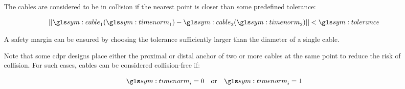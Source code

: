	The cables are considered to be in collision if the nearest point is closer
	than some predefined tolerance:

	\begin{equation}
		\norm{\cable_1(\timenorm_1) - \cable_2(\timenorm_2)} < \tol
	\end{equation}

	A safety margin can be ensured by choosing the tolerance sufficiently larger
	than the diameter of a single cable.

	Note that some \gls{cdpr} designs place either the proximal or distal anchor
	of two or more cables at the same point to reduce the risk of
	collision. For such cases, cables can be considered
	collision-free if:

	\begin{equation}
		\timenorm_i = 0 \quad\text{or}\quad \timenorm_i = 1
	\end{equation}
